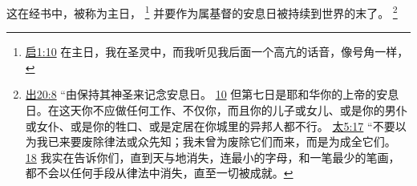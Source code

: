 \documentclass[12pt, a4paper, oneside]{ctexart}
\begin{document}
	这在经书中，被称为主日，
	\footnote {
		\href{https://biblehub.com/revelation/1-10.htm}{启1:10} 在主日，我在圣灵中，而我听见我后面一个高亢的话音，像号角一样，
	}
	并要作为属基督的安息日被持续到世界的末了。
	\footnote {
		\href{https://biblehub.com/exodus/20-8.htm}{出20:8} “由保持其神圣来记念安息日。
		\href{https://biblehub.com/exodus/20-10.htm}{10} 但第七日是耶和华你的上帝的安息日。在这天你不应做任何工作、不仅你，而且你的儿子或女儿、或是你的男仆或女仆、或是你的牲口、或是定居在你城里的异邦人都不行。
		\href{https://biblehub.com/matthew/5-17.htm}{太5:17} “不要以为我已来要废除律法或众先知；我未曾为废除它们而来，而是为成全它们。
		\href{https://biblehub.com/matthew/5-18.htm}{18} 我实在告诉你们，直到天与地消失，连最小的字母，和一笔最少的笔画，都不会以任何手段从律法中消失，直至一切被成就。
	}
\end{document}

